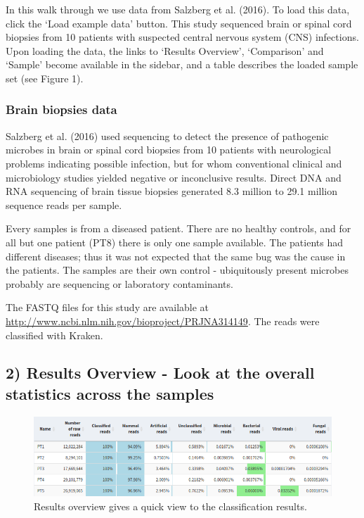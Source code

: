 \documentclass[]{article}
\begin{document}
In this walk through we use data from Salzberg et al. (2016). To load
this data, click the `Load example data' button. This study sequenced
brain or spinal cord biopsies from 10 patients with suspected central
nervous system (CNS) infections. Upon loading the data, the links to
`Results Overview', `Comparison' and `Sample' become available in the
sidebar, and a table describes the loaded sample set (see Figure 1).

\subsubsection{Brain biopsies data}\label{brain-biopsies-data}

Salzberg et al. (2016) used sequencing to detect the presence of
pathogenic microbes in brain or spinal cord biopsies from 10 patients
with neurological problems indicating possible infection, but for whom
conventional clinical and microbiology studies yielded negative or
inconclusive results. Direct DNA and RNA sequencing of brain tissue
biopsies generated 8.3 million to 29.1 million sequence reads per
sample.

Every samples is from a diseased patient. There are no healthy controls,
and for all but one patient (PT8) there is only one sample available.
The patients had different diseases; thus it was not expected that the
same bug was the cause in the patients. The samples are their own
control - ubiquitously present microbes probably are sequencing or
laboratory contaminants.

The FASTQ files for this study are available at
\url{http://www.ncbi.nlm.nih.gov/bioproject/PRJNA314149}. The reads were
classified with Kraken.

\subsection{2) Results Overview - Look at the overall statistics across
the
samples}\label{results-overview---look-at-the-overall-statistics-across-the-samples}

\begin{figure}[htbp]
\centering
\includegraphics{results-overview.png}
\caption{Results overview gives a quick view to the classification
results.}
\end{figure}
\end{document}
